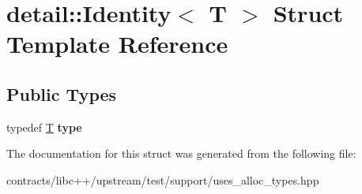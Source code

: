 \hypertarget{structdetail_1_1_identity}{}\section{detail\+:\+:Identity$<$ T $>$ Struct Template Reference}
\label{structdetail_1_1_identity}
\subsection*{Public Types}
\begin{DoxyCompactItemize}
\item 
\mbox{\label{structdetail_1_1_identity_a6a380ce87cd8d8fe924956df472ea3b3}} 
typedef \mbox{\hyperlink{struct_t}{T}} {\bfseries type}
\end{DoxyCompactItemize}


The documentation for this struct was generated from the following file\+:\begin{DoxyCompactItemize}
\item 
contracts/libc++/upstream/test/support/uses\+\_\+alloc\+\_\+types.\+hpp\end{DoxyCompactItemize}
